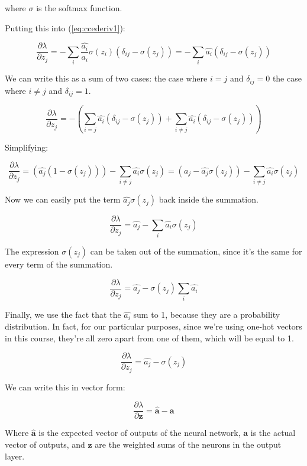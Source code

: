 \documentclass[12pt]{article}
\begin{document}
where $\sigma$ is the softmax function.
\bigskip

Putting this into (\ref{eq:ccederiv1}):

$$
\frac{\partial \lambda}{\partial z_j}=
-\sum_i \frac{\hat{a_i}}{a_i}\sigma(z_i)(\delta_{ij} - \sigma(z_j))
=-\sum_i \hat{a_i}(\delta_{ij} - \sigma(z_j))
$$

We can write this as a sum of two cases: the case where $i=j$ and $\delta_{ij}=0$ the case where $i \neq j$ and $\delta_{ij}=1$.

$$
\frac{\partial \lambda}{\partial z_j}=
-\left(\sum_{i=j} \hat{a_i}(\delta_{ij} - \sigma(z_j)) + \sum_{i \neq j} \hat{a_i}(\delta_{ij} - \sigma(z_j))\right)
$$

Simplifying:

$$
\frac{\partial \lambda}{\partial z_j}=
(\hat{a_j}(1 - \sigma(z_j))) - \sum_{i \neq j} \hat{a_i} \sigma(z_j)
=(\hat{a_j} - \hat{a_j}\sigma(z_j)) - \sum_{i \neq j} \hat{a_i} \sigma(z_j)
$$

Now we can easily put the term $\hat{a_j}\sigma(z_j)$ back inside the summation.

$$
\frac{\partial \lambda}{\partial z_j}=
\hat{a_j} - \sum_{i} \hat{a_i} \sigma(z_j)
$$

The expression $\sigma(z_j)$ can be taken out of the summation, since it's the same for every term of the summation.

$$
\frac{\partial \lambda}{\partial z_j}=
\hat{a_j} - \sigma(z_j)\sum_{i} \hat{a_i}
$$

Finally, we use the fact that the $\hat{a_i}$ sum to 1, because they are a probability distribution. In fact, for our particular purposes, since we're using one-hot vectors in this course, they're all zero apart from one of them, which will be equal to 1.

$$
\frac{\partial \lambda}{\partial z_j}=
\hat{a_j} - \sigma(z_j)
$$

We can write this in vector form:

$$
\frac{\partial \lambda}{\partial \mathbf{z}}=
\mathbf{\hat{a}} - \mathbf{a}
$$

Where $\mathbf{\hat{a}}$ is the expected vector of outputs of the neural network, $\mathbf{a}$ is the actual vector of outputs, and $\mathbf{z}$ are the weighted sums of the neurons in the output layer.



\end{document}
